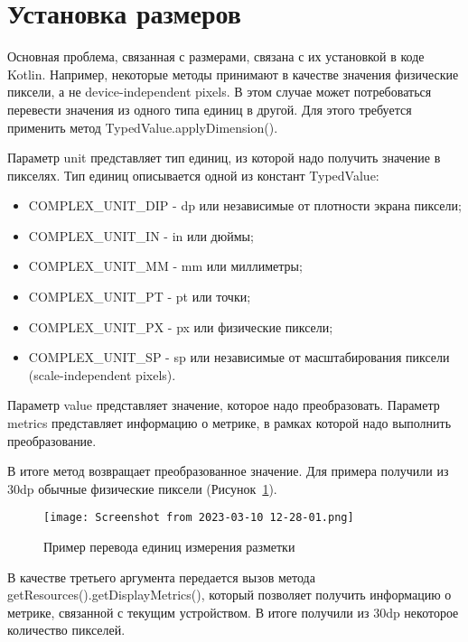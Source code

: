 \section{Установка размеров}
Основная проблема, связанная с размерами, связана с их установкой в коде
Kotlin. Например, некоторые методы принимают в качестве значения
физические пиксели, а не device-independent pixels. В этом случае может
потребоваться перевести значения из одного типа единиц в другой. Для этого
требуется применить метод TypedValue.applyDimension().\par
Параметр unit представляет тип единиц, из которой надо получить значение в
пикселях. Тип единиц описывается одной из констант TypedValue:
\begin{itemize}
	\item COMPLEX\_UNIT\_DIP - dp или независимые от плотности экрана пиксели;
	\item COMPLEX\_UNIT\_IN - in или дюймы;
	\item COMPLEX\_UNIT\_MM - mm или миллиметры;
	\item COMPLEX\_UNIT\_PT - pt или точки;
	\item COMPLEX\_UNIT\_PX - px или физические пиксели;
	\item COMPLEX\_UNIT\_SP - sp или независимые от масштабирования
		пиксели (scale-independent pixels).
\end{itemize}

Параметр value представляет значение, которое надо преобразовать.
Параметр metrics представляет информацию о метрике, в рамках которой
надо выполнить преобразование.\par
В итоге метод возвращает преобразованное значение. 
Для примера получили из 30dp обычные физические пиксели
(Рисунок~\ref{fig:java:applydim}).

\begin{figure}[h!tp]
	\centering
	\texttt{[image: Screenshot from 2023-03-10 12-28-01.png]}
	\caption{Пример перевода единиц измерения разметки}
	\label{fig:java:applydim}
\end{figure}

В качестве третьего аргумента передается вызов метода
getResources().getDisplayMetrics(), который позволяет получить информацию
о метрике, связанной с текущим устройством. В итоге получили из 30dp
некоторое количество пикселей.

